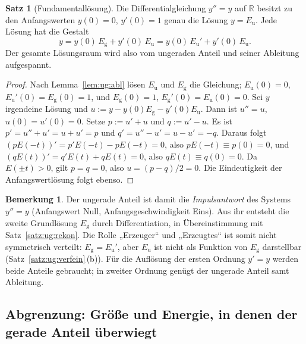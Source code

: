 \documentclass[a4paper,12pt,twoside]{report}
\theoremstyle{definition}
\newtheorem{satz}{Satz}
\newtheorem{bemerkung}{Bemerkung}
\begin{document}
\begin{satz}[Fundamentallösung]\label{satz:ug:fund}
Die Differentialgleichung $y''=y$ auf $\mathbb{R}$ besitzt zu den Anfangswerten $y(0)=0$, $y'(0)=1$ genau die Lösung $y=E_{\mathrm u}$. Jede Lösung hat die Gestalt
\[
y=y(0)\,E_{\mathrm g}+y'(0)\,E_{\mathrm u}=y(0)\,E_{\mathrm u}'+y'(0)\,E_{\mathrm u}.
\]
Der gesamte Lösungsraum wird also vom ungeraden Anteil und seiner Ableitung aufgespannt.
\end{satz}

\begin{proof}
Nach Lemma~\ref{lem:ug:abl} lösen $E_{\mathrm u}$ und $E_{\mathrm g}$ die Gleichung; $E_{\mathrm u}(0)=0$, $E_{\mathrm u}'(0)=E_{\mathrm g}(0)=1$, und $E_{\mathrm g}(0)=1$, $E_{\mathrm g}'(0)=E_{\mathrm u}(0)=0$. Sei $y$ irgendeine Lösung und $u:=y-y(0)E_{\mathrm g}-y'(0)E_{\mathrm u}$. Dann ist $u''=u$, $u(0)=u'(0)=0$. Setze $p:=u'+u$ und $q:=u'-u$. Es ist $p'=u''+u'=u+u'=p$ und $q'=u''-u'=u-u'=-q$. Daraus folgt $(pE(-t))'=p'E(-t)-pE(-t)=0$, also $pE(-t)\equiv p(0)=0$, und $(qE(t))'=q'E(t)+qE(t)=0$, also $qE(t)\equiv q(0)=0$. Da $E(\pm t)>0$, gilt $p=q=0$, also $u=(p-q)/2=0$. Die Eindeutigkeit der Anfangswertlösung folgt ebenso.
\end{proof}

\begin{bemerkung}
Der ungerade Anteil ist damit die \emph{Impulsantwort} des Systems $y''=y$ (Anfangswert Null, Anfangsgeschwindigkeit Eins). Aus ihr entsteht die zweite Grundlösung $E_{\mathrm g}$ durch Differentiation, in Übereinstimmung mit Satz~\ref{satz:ug:rekon}. Die Rolle „Erzeuger“ und „Erzeugtes“ ist somit nicht symmetrisch verteilt: $E_{\mathrm g}=E_{\mathrm u}'$, aber $E_{\mathrm u}$ ist nicht als Funktion von $E_{\mathrm g}$ darstellbar (Satz~\ref{satz:ug:verfein}\,(b)). Für die Auflösung der ersten Ordnung $y'=y$ werden beide Anteile gebraucht; in zweiter Ordnung genügt der ungerade Anteil samt Ableitung.
\end{bemerkung}

\subsection{Abgrenzung: Größe und Energie, in denen der gerade Anteil überwiegt}
\label{sec:ug:gewicht}
\end{document}
